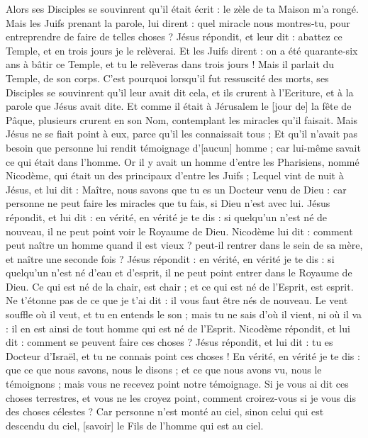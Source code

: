 \begin{multicols}{2}
Alors ses Disciples se souvinrent qu'il était écrit : le zèle de ta Maison m'a rongé.
Mais les Juifs prenant la parole, lui dirent : quel miracle nous montres-tu, pour entreprendre de faire de telles choses ?
Jésus répondit, et leur dit : abattez ce Temple, et en trois jours je le relèverai.
Et les Juifs dirent : on a été quarante-six ans à bâtir ce Temple, et tu le relèveras dans trois jours !
Mais il parlait du Temple, de son corps.
C'est pourquoi lorsqu'il fut ressuscité des morts, ses Disciples se souvinrent qu'il leur avait dit cela, et ils crurent à l'Ecriture, et à la parole que Jésus avait dite.
Et comme il était à Jérusalem le [jour de] la fête de Pâque, plusieurs crurent en son Nom, contemplant les miracles qu'il faisait.
Mais Jésus ne se fiait point à eux, parce qu'il les connaissait tous ;
Et qu'il n'avait pas besoin que personne lui rendit témoignage d'[aucun] homme ; car lui-même savait ce qui était dans l'homme.
\VerseOne{}Or il y avait un homme d'entre les Pharisiens, nommé Nicodème, qui était un des principaux d'entre les Juifs ;
Lequel vint de nuit à Jésus, et lui dit : Maître, nous savons que tu es un Docteur venu de Dieu : car personne ne peut faire les miracles que tu fais, si Dieu n'est avec lui.
Jésus répondit, et lui dit : en vérité, en vérité je te dis : si quelqu'un n'est né de nouveau, il ne peut point voir le Royaume de Dieu.
Nicodème lui dit : comment peut naître un homme quand il est vieux ? peut-il rentrer dans le sein de sa mère, et naître une seconde fois ?
Jésus répondit : en vérité, en vérité je te dis : si quelqu'un n'est né d'eau et d'esprit, il ne peut point entrer dans le Royaume de Dieu.
Ce qui est né de la chair, est chair ; et ce qui est né de l'Esprit, est esprit.
Ne t'étonne pas de ce que je t'ai dit : il vous faut être nés de nouveau.
Le vent souffle où il veut, et tu en entends le son ; mais tu ne sais d'où il vient, ni où il va : il en est ainsi de tout homme qui est né de l'Esprit.
Nicodème répondit, et lui dit : comment se peuvent faire ces choses ?
Jésus répondit, et lui dit : tu es Docteur d'Israël, et tu ne connais point ces choses !
En vérité, en vérité je te dis : que ce que nous savons, nous le disons ; et ce que nous avons vu, nous le témoignons ; mais vous ne recevez point notre témoignage.
Si je vous ai dit ces choses terrestres, et vous ne les croyez point, comment croirez-vous si je vous dis des choses célestes ?
Car personne n'est monté au ciel, sinon celui qui est descendu du ciel, [savoir] le Fils de l'homme qui est au ciel.

\end{multicols}
